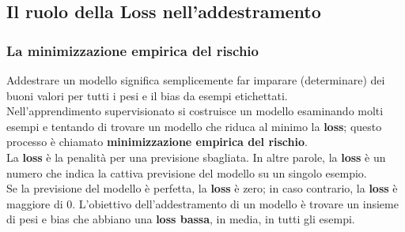 \subsection[Il ruolo della Loss nell'addestramento]{Il ruolo della Loss nell'addestramento}


\begin{frame}

	\frametitle{La minimizzazione empirica del rischio}

	\begin{block}{}
		Addestrare un modello significa semplicemente far imparare (determinare) dei buoni valori per tutti i pesi e il bias da esempi etichettati.\\
		\vspace{3mm}
		Nell'apprendimento supervisionato si costruisce un modello esaminando molti esempi e tentando di trovare un modello che riduca al minimo la \textbf{loss}; questo processo è chiamato \textbf{minimizzazione empirica del rischio}.\\
		\vspace{3mm}
		La \textbf{loss} è la penalità per una previsione sbagliata. In altre parole, la \textbf{loss} è un numero che indica la cattiva previsione del modello su un singolo esempio.\\
		\vspace{3mm}
		Se la previsione del modello è perfetta, la \textbf{loss} è zero; in caso contrario, la \textbf{loss} è maggiore di 0. L'obiettivo dell'addestramento di un modello è trovare un insieme di pesi e bias che abbiano una \textbf{loss bassa}, in media, in tutti gli esempi.
	\end{block}

\end{frame}


